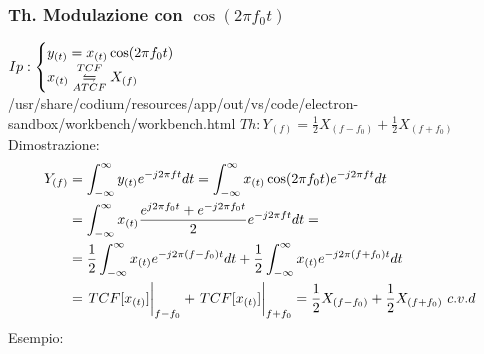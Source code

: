         \subsubsection{Th. Modulazione con $\cos(2\pi f_0t)$}\label{Modulazione con coseno}
            $Ip:\begin{cases}
                    y_{(t)}= x_{(t)}\cos(2\pi f_0t)\\        
                    x_{(t)}\overunderset{TCF}{ATCF}{\leftrightharpoons} X_{(f)}
                \end{cases}$\\/usr/share/codium/resources/app/out/vs/code/electron-sandbox/workbench/workbench.html
            $Th: Y_{(f)} = \frac{1}{2} X_{(f-f_0)} + \frac{1}{2} X_{(f+f_0)}$ \\
            Dimostrazione:
            \begin{align}
                Y_{(f)} & = \int_{-\infty}^{\infty} y_{(t)} e^{-j2\pi ft} dt = \int_{-\infty}^{\infty} x_{(t)}\cos(2\pi f_0t) e^{-j2\pi ft} dt \nonumber \\
                & =\int_{-\infty}^{\infty} x_{(t)} \frac{e^{j2\pi f_0t} + e^{-j2\pi f_0t}}{2} e^{-j2\pi ft} dt =  \nonumber \\
                & = \frac{1}{2} \int_{-\infty}^{\infty} x_{(t)} e^{-j2\pi (f-f_0)t} dt + \frac{1}{2} \int_{-\infty}^{\infty} x_{(t)} e^{-j2\pi (f+f_0)t} dt \nonumber \\
                & = \eval{TCF[x_{(t)}]}_{f-f_0} + \eval{TCF[x_{(t)}]}_{f+f_0} = \frac{1}{2} X_{(f-f_0)} + \frac{1}{2} X_{(f+f_0)}\ c.v.d \nonumber  
            \end{align}
            Esempio:\\
